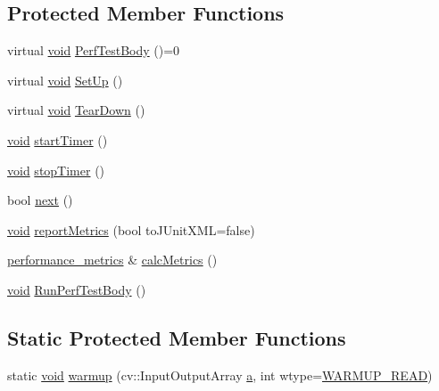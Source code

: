 \subsection*{Protected Member Functions}
\begin{DoxyCompactItemize}
\item 
virtual \hyperlink{legacy_8hpp_a8bb47f092d473522721002c86c13b94e}{void} \hyperlink{classperf_1_1TestBase_aa206aa9d492f0f930d1593ff231ed022}{Perf\-Test\-Body} ()=0
\item 
virtual \hyperlink{legacy_8hpp_a8bb47f092d473522721002c86c13b94e}{void} \hyperlink{classperf_1_1TestBase_a3f966246d7b641d63ee6c6ee56429d7e}{Set\-Up} ()
\item 
virtual \hyperlink{legacy_8hpp_a8bb47f092d473522721002c86c13b94e}{void} \hyperlink{classperf_1_1TestBase_afceb7f961d1d17e285dce0330a406929}{Tear\-Down} ()
\item 
\hyperlink{legacy_8hpp_a8bb47f092d473522721002c86c13b94e}{void} \hyperlink{classperf_1_1TestBase_a62cb8c8a482c7a566c7f4b2a9266ac3f}{start\-Timer} ()
\item 
\hyperlink{legacy_8hpp_a8bb47f092d473522721002c86c13b94e}{void} \hyperlink{classperf_1_1TestBase_ac823dd0211529db6a2a7816a11ec5583}{stop\-Timer} ()
\item 
bool \hyperlink{classperf_1_1TestBase_a2777ab8a13c39629a5755acd2edcc79a}{next} ()
\item 
\hyperlink{legacy_8hpp_a8bb47f092d473522721002c86c13b94e}{void} \hyperlink{classperf_1_1TestBase_a8cb1d05cb1d9cbe45dfd1267d2914ac9}{report\-Metrics} (bool to\-J\-Unit\-X\-M\-L=false)
\item 
\hyperlink{structperf_1_1performance__metrics}{performance\-\_\-metrics} \& \hyperlink{classperf_1_1TestBase_a6a0b90d1934de9c619f8b71964b2a8b6}{calc\-Metrics} ()
\item 
\hyperlink{legacy_8hpp_a8bb47f092d473522721002c86c13b94e}{void} \hyperlink{classperf_1_1TestBase_a64992faed4b0ec09237e165e53ebae0d}{Run\-Perf\-Test\-Body} ()
\end{DoxyCompactItemize}
\subsection*{Static Protected Member Functions}
\begin{DoxyCompactItemize}
\item 
static \hyperlink{legacy_8hpp_a8bb47f092d473522721002c86c13b94e}{void} \hyperlink{classperf_1_1TestBase_ae147f8300d4b64452448c529249d3420}{warmup} (cv\-::\-Input\-Output\-Array \hyperlink{legacy_8hpp_a1031d0e0a97a340abfe0a6ab9e831045}{a}, int wtype=\hyperlink{classperf_1_1TestBase_ac5e0802870e938aef3c7eca288eaa57eae6c5cd60009a21181231f958eb0564ac}{W\-A\-R\-M\-U\-P\-\_\-\-R\-E\-A\-D})
\end{DoxyCompactItemize}
